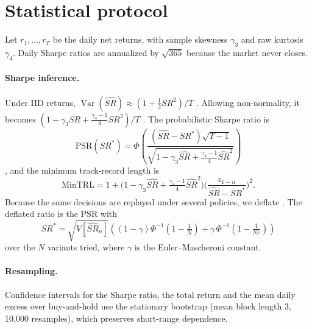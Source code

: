 \documentclass[11pt]{article}
\theoremstyle{remark}
\begin{document}
\section{Statistical protocol}\label{sec:stats}

Let $r_1,\dots,r_T$ be the daily net returns, with sample skewness $\gamma_3$ and raw kurtosis $\gamma_4$. Daily Sharpe ratios are annualized by $\sqrt{365}$ because the market never closes.

\paragraph{Sharpe inference.} Under IID returns, $\operatorname{Var}(\widehat{SR})\approx(1+\tfrac12SR^2)/T$ \citep{lo2002statistics}. Allowing non-normality, it becomes $(1-\gamma_3SR+\tfrac{\gamma_4-1}{4}SR^2)/T$ \citep{mertens2002comments}. The probabilistic Sharpe ratio is
\[
\mathrm{PSR}(SR^\ast)=\Phi\!\left(\frac{(\widehat{SR}-SR^\ast)\sqrt{T-1}}{\sqrt{1-\gamma_3\widehat{SR}+\frac{\gamma_4-1}{4}\widehat{SR}^2}}\right)
\]
\citep{bailey2012sharpe}, and the minimum track-record length is
\[
\mathrm{MinTRL}=1+\Big(1-\gamma_3\widehat{SR}+\tfrac{\gamma_4-1}{4}\widehat{SR}^2\Big)\Big(\frac{z_{1-\alpha}}{\widehat{SR}-SR^\ast}\Big)^2.
\]
Because the same decisions are replayed under several policies, we deflate \citep{bailey2014deflated,harvey2015backtesting,bailey2017pbo}. The deflated ratio is the PSR with
\[
SR^\ast=\sqrt{V[\widehat{SR}_n]}\left((1-\gamma)\Phi^{-1}(1-\tfrac1N)+\gamma\,\Phi^{-1}(1-\tfrac{1}{Ne})\right)
\]
over the $N$ variants tried, where $\gamma$ is the Euler--Mascheroni constant.

\paragraph{Resampling.} Confidence intervals for the Sharpe ratio, the total return and the mean daily excess over buy-and-hold use the stationary bootstrap \citep{politis1994stationary} (mean block length 3, 10{,}000 resamples), which preserves short-range dependence.
\end{document}
